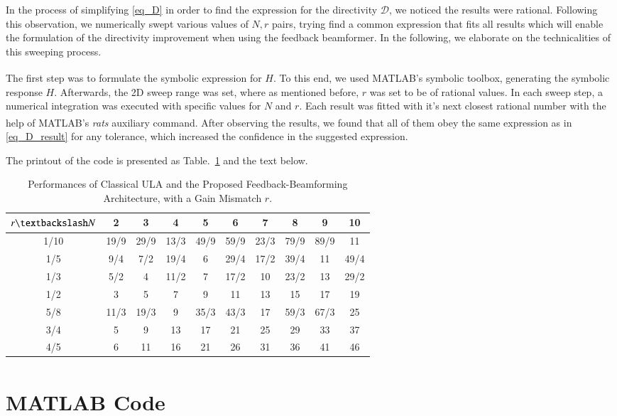 In the process of simplifying \eqref{eq_D} in order to find the expression for the directivity $\mathcal{D}$, we noticed the results were rational.
Following this observation, we numerically swept various values of $N,r$ pairs, trying find a common expression that fits all results which will enable the formulation of the directivity improvement when using the feedback beamformer.
In the following, we elaborate on the technicalities of this sweeping process.
\par The first step was to formulate the symbolic expression for $H$.
To this end, we used MATLAB\textsuperscript{\textregistered}'s symbolic toolbox, generating the symbolic response $H$.
Afterwards, the 2D sweep range was set, where as mentioned before, $r$ was set to be of rational values.
In each sweep step, a numerical integration was executed with specific values for $N$ and $r$.
Each result was fitted with it's next closest rational number with the help of MATLAB\textsuperscript{\textregistered}'s \emph{rats} auxiliary command.
After observing the results, we found that all of them obey the same expression as in \eqref{eq_D_result} for any tolerance, which increased the confidence in the suggested expression.
\par The printout of the code is presented as Table.~\ref{table_D} and the text below.
\begin{table}[h!]
    \caption{Performances of Classical ULA and the Proposed Feedback-Beamforming Architecture, with a Gain Mismatch $r$.}
    \centering
    {
        \begin{tabular}{||c c c c c c c c c c||}
            \hline
            $r \textbackslash N$ & 2 & 3 & 4 & 5 & 6 & 7 & 8 & 9 & 10 \\ [0.5ex] 
            \hline\hline
            1/10     & 19/9  & 29/9  & 13/3  & 49/9  & 59/9  & 23/3  & 79/9  & 89/9  & 11   \\ [1ex] 
            1/5      & 9/4   & 7/2   & 19/4  & 6     & 29/4  & 17/2  & 39/4  & 11    & 49/4 \\ [1ex] 
            1/3      & 5/2   & 4     & 11/2  & 7     & 17/2  & 10    & 23/2  & 13    & 29/2 \\ [1ex] 
            1/2      & 3     & 5     & 7     & 9     & 11    & 13    & 15    & 17    & 19   \\ [1ex] 
            5/8      & 11/3  & 19/3  & 9     & 35/3  & 43/3  & 17    & 59/3  & 67/3  & 25   \\ [1ex] 
            3/4      & 5     & 9     & 13    & 17    & 21    & 25    & 29    & 33    & 37   \\ [1ex] 
            4/5      & 6     & 11    & 16    & 21    & 26    & 31    & 36    & 41    & 46   \\ [1ex] 
            \hline
         \end{tabular}
     }
    \label{table_D}
\end{table}
\section*{MATLAB\textsuperscript{\textregistered} Code}

